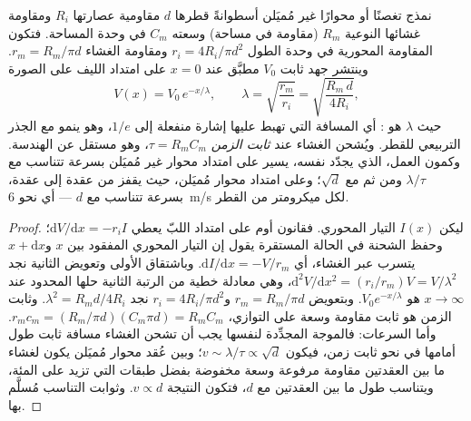 \begin{theorem}\label{thm:b3:nervous-systems:cable}
نمذج تغصنًا أو محوارًا غير مُميَلن أسطوانةً قطرها $d$
مقاومية عصارتها $R_{i}$ ومقاومة غشائها النوعية $R_{m}$
(مقاومة في مساحة) وسعته $C_{m}$ في وحدة المساحة. فتكون
المقاومة المحورية في وحدة الطول $r_{i} = 4R_{i}/\pi d^{2}$
ومقاومة الغشاء $r_{m} = R_{m}/\pi d$. وينتشر جهد ثابت
$V_{0}$ مطبَّق عند $x = 0$ على امتداد الليف على الصورة
\[
V(x) = V_{0}\,e^{-x/\lambda}, \qquad
\lambda = \sqrt{\frac{r_{m}}{r_{i}}} = \sqrt{\frac{R_{m}\,d}{4R_{i}}},
\]
حيث $\lambda$ هو \emph{}: أي المسافة التي تهبط
عليها إشارة منفعلة إلى $1/e$، وهو ينمو مع الجذر التربيعي
للقطر. ويُشحن الغشاء عند \emph{ثابت الزمن} $\tau =
R_{m}C_{m}$، وهو مستقل عن الهندسة. وكمون العمل، الذي يجدّد
نفسه، يسير على امتداد محوار غير مُميَلن بسرعة تتناسب مع
$\lambda/\tau$ ومن ثم مع $\sqrt{d}$؛ وعلى امتداد محوار
مُميَلن، حيث يقفز من عقدة إلى عقدة، بسرعة تتناسب مع $d$ ---
أي نحو \qty{6}{m/s} لكل ميكرومتر من القطر.
\end{theorem}
\begin{proof}
ليكن $I(x)$ التيار المحوري. فقانون أوم على امتداد اللبّ
يعطي $\mathrm{d}V/\mathrm{d}x = -r_{i}I$؛ وحفظ الشحنة في
الحالة المستقرة يقول إن التيار المحوري المفقود بين $x$
و$x + \mathrm{d}x$ يتسرب عبر الغشاء، أي
$\mathrm{d}I/\mathrm{d}x = -V/r_{m}$. وباشتقاق الأولى
وتعويض الثانية نجد
$\mathrm{d}^{2}V/\mathrm{d}x^{2} = (r_{i}/r_{m})V = V/\lambda^{2}$، وهي
معادلة خطية من الرتبة الثانية حلها المحدود عند $x \to \infty$ هو
$V_{0}e^{-x/\lambda}$. وبتعويض $r_{m} = R_{m}/\pi d$ و$r_{i} =
4R_{i}/\pi d^{2}$ نجد $\lambda^{2} = R_{m}d/4R_{i}$. وثابت الزمن
هو ثابت مقاومة وسعة على التوازي، $r_{m}c_{m} =
(R_{m}/\pi d)(C_{m}\pi d) = R_{m}C_{m}$. وأما السرعات: فالموجة
المجدِّدة لنفسها يجب أن تشحن الغشاء مسافة ثابت طول أمامها
في نحو ثابت زمن، فيكون $v \sim \lambda/\tau \propto \sqrt{d}$؛
وبين عُقد محوار مُميَلن يكون لغشاء ما بين العقدتين مقاومة
مرفوعة وسعة مخفوضة بفضل طبقات  التي تزيد على المئة،
ويتناسب طول ما بين العقدتين مع $d$، فتكون النتيجة
$v \propto d$. وثوابت التناسب مُسلَّم بها.
\end{proof}

